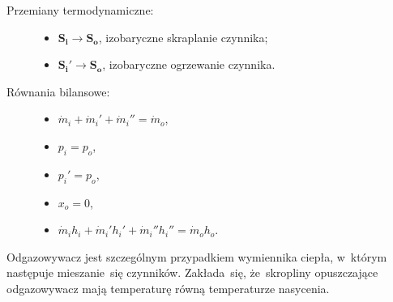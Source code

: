 \begin{description}

	\item[Przemiany termodynamiczne:] \hfill

		\begin{itemize}

			\item $\mathbf{S_i} \rightarrow \mathbf{S_o}$,
				izobaryczne skraplanie czynnika;

			\item $\mathbf{S_i'} \rightarrow \mathbf{S_o}$,
				izobaryczne ogrzewanie czynnika.

		\end{itemize}

	\item[Równania bilansowe:] \hfill

		\begin{itemize}

			\item \eq$\dot m_i + \dot m_i' + \dot m_i'' = \dot m_o$,

			\item \eq$p_i = p_o$,

			\item \eq$p_i' = p_o$,

			\item \eq$x_o = 0$,

			\item \eq$\dot m_i h_i + \dot m_i' h_i' + \dot m_i'' h_i''
				= \dot m_o h_o$.

		\end{itemize}

\end{description}

Odgazowywacz jest szczególnym przypadkiem wymiennika ciepła, w~którym
następuje mieszanie~się czynników. Zakłada~się, że~skropliny
opuszczające odgazowywacz mają temperaturę równą temperaturze nasycenia.
